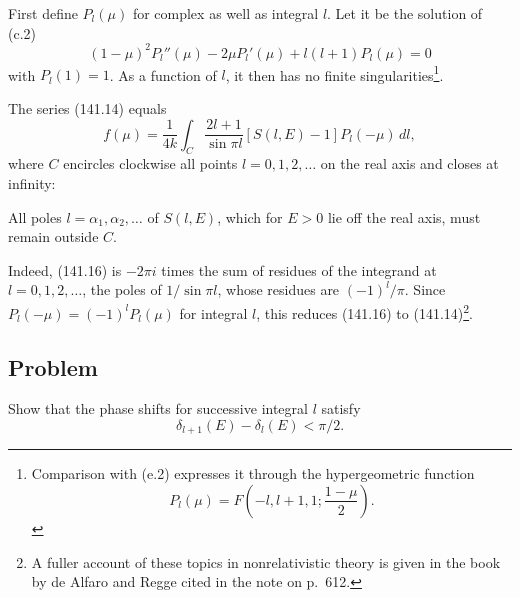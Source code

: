 First define $P_l(\mu)$ for complex as well as integral $l$. Let it be the solution of (c.2)
\begin{equation}
 (1-\mu)^2P_l''(\mu)-2\mu P_l'(\mu)+l(l+1)P_l(\mu)=0
 \tag{141.15}
\end{equation}
with $P_l(1)=1$. As a function of $l$, it then has no finite singularities\footnote{Comparison with (e.2) expresses it through the hypergeometric function
\[
 P_l(\mu)=F\left(-l,l+1,1;\frac{1-\mu}{2}\right).
\]}.

The series (141.14) equals
\begin{equation}
 f(\mu)=\frac1{4k}\int_C\frac{2l+1}{\sin\pi l}[S(l,E)-1]P_l(-\mu)\,dl,
 \tag{141.16}
\end{equation}
where $C$ encircles clockwise all points $l=0,1,2,\ldots$ on the real axis and closes at infinity:

\begin{center}
\end{center}

All poles $l=\alpha_1,\alpha_2,\ldots$ of $S(l,E)$, which for $E>0$ lie off the real axis, must remain outside $C$.

Indeed, (141.16) is $-2\pi i$ times the sum of residues of the integrand at $l=0,1,2,\ldots$, the poles of $1/\sin\pi l$, whose residues are $(-1)^l/\pi$. Since $P_l(-\mu)=(-1)^lP_l(\mu)$ for integral $l$, this reduces (141.16) to (141.14)\footnote{A fuller account of these topics in nonrelativistic theory is given in the book by de Alfaro and Regge cited in the note on p.~612.}.

\subsection*{Problem}

Show that the phase shifts for successive integral $l$ satisfy
\[
 \delta_{l+1}(E)-\delta_l(E)<\pi/2.
\]


